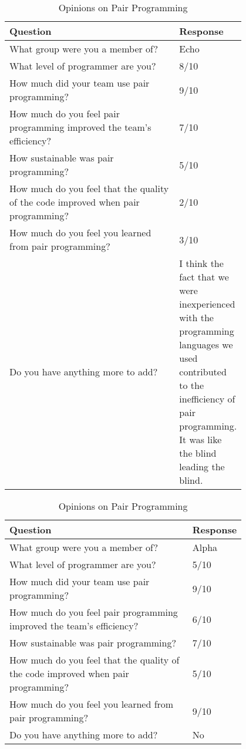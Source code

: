 \documentclass{article}
\begin{document}
\begin{table}[ht]
\centering
\renewcommand{\arraystretch}{1.3}
\caption{Opinions on Pair Programming}
\begin{tabular}{|p{0.8\linewidth}|l|}
\hline
\textbf{Question} & \textbf{Response} \\
\hline
What group were you a member of? & Echo \\
\hline 
What level of programmer are you? & 8/10\\
\hline 
How much did your team use pair programming? & 9/10\\
\hline 
How much do you feel pair programming improved the team's efficiency? & 7/10\\
\hline 
How sustainable was pair programming? & 5/10\\
\hline 
How much do you feel that the quality of the code improved when pair programming? & 2/10\\
\hline 
How much do you feel you learned from pair programming? & 3/10\\
\hline 
Do you have anything more to add? & I think the fact that we were inexperienced with the programming languages we used contributed to the inefficiency of pair programming. It was like the blind leading the blind.\\
\hline
\end{tabular}
\end{table}

\begin{table}[ht]
\centering
\renewcommand{\arraystretch}{1.3}
\caption{Opinions on Pair Programming}
\begin{tabular}{|p{0.8\linewidth}|l|}
\hline
\textbf{Question} & \textbf{Response} \\
\hline
What group were you a member of? & Alpha \\
\hline 
What level of programmer are you? & 5/10\\
\hline 
How much did your team use pair programming? & 9/10\\
\hline 
How much do you feel pair programming improved the team's efficiency? & 6/10\\
\hline 
How sustainable was pair programming? & 7/10\\
\hline 
How much do you feel that the quality of the code improved when pair programming? & 5/10\\
\hline 
How much do you feel you learned from pair programming? & 9/10\\
\hline 
Do you have anything more to add? &  No\\
\hline
\end{tabular}
\end{table}
\end{document}
